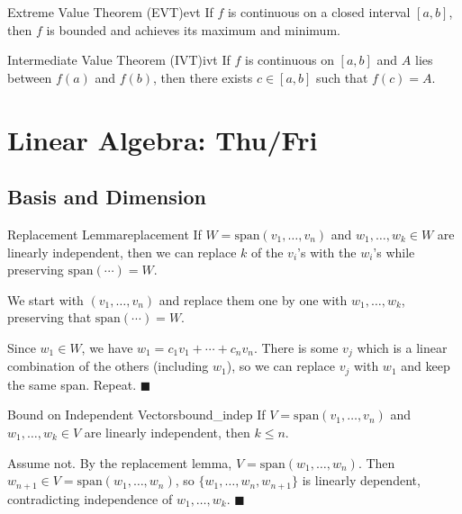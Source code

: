 \documentclass[11pt, letterpaper, openany]{book}
\renewenvironment{proof}[1][\proofname]{%
  \tcolorbox[blanker, breakable, left=1em,
    before skip=1em, after skip=1em,
    borderline west={2pt}{0pt}{MagicTeal!50},
    colback=MagicCream,
    before upper={\textcolor{MagicTeal}{\sffamily\bfseries #1.}\space}
  ]%
}{%
  \hfill\textcolor{MagicTeal}{\ensuremath{\blacksquare}}\endtcolorbox%
}
\begin{document}
\begin{thm}{Extreme Value Theorem (EVT)}{evt}
If $f$ is continuous on a closed interval $[a,b]$, then $f$ is bounded and achieves its maximum and minimum.
\end{thm}

\begin{thm}{Intermediate Value Theorem (IVT)}{ivt}
If $f$ is continuous on $[a,b]$ and $A$ lies between $f(a)$ and $f(b)$, then there exists $c \in [a,b]$ such that $f(c) = A$.
\end{thm}

\section{Linear Algebra: Thu/Fri}

\subsection{Basis and Dimension}

\begin{lem}{Replacement Lemma}{replacement}
If $W = \text{span}(v_1, \ldots, v_n)$ and $w_1, \ldots, w_k \in W$ are linearly independent, then we can replace $k$ of the $v_i$'s with the $w_i$'s while preserving $\text{span}(\cdots) = W$.
\end{lem}

\begin{proof}[Sketch]
We start with $(v_1, \ldots, v_n)$ and replace them one by one with $w_1, \ldots, w_k$, preserving that $\text{span}(\cdots) = W$.

Since $w_1 \in W$, we have $w_1 = c_1 v_1 + \cdots + c_n v_n$. There is some $v_j$ which is a linear combination of the others (including $w_1$), so we can replace $v_j$ with $w_1$ and keep the same span. Repeat.
\end{proof}

\begin{lem}{Bound on Independent Vectors}{bound_indep}
If $V = \text{span}(v_1, \ldots, v_n)$ and $w_1, \ldots, w_k \in V$ are linearly independent, then $k \leq n$.
\end{lem}

\begin{proof}
Assume not. By the replacement lemma, $V = \text{span}(w_1, \ldots, w_n)$. Then $w_{n+1} \in V = \text{span}(w_1, \ldots, w_n)$, so $\{w_1, \ldots, w_n, w_{n+1}\}$ is linearly dependent, contradicting independence of $w_1, \ldots, w_k$.
\end{proof}
\end{document}
